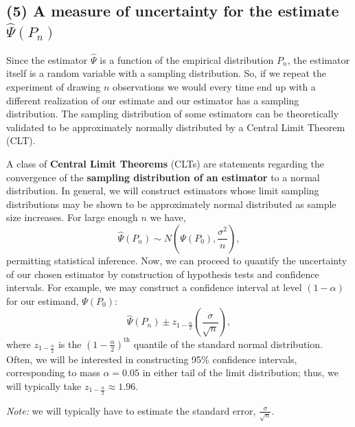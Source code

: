\documentclass[12pt, krantz2,]{book}
\theoremstyle{definition}
\theoremstyle{definition}
\theoremstyle{definition}
\newcommand{\1}{\mathbbm{1}}
\begin{document}
\hypertarget{a-measure-of-uncertainty-for-the-estimate-hatpsip_n}{%
\subsection*{\texorpdfstring{(5) A measure of uncertainty for the estimate \(\hat{\Psi}(P_n)\)}{(5) A measure of uncertainty for the estimate \textbackslash{}hat\{\textbackslash{}Psi\}(P\_n)}}\label{a-measure-of-uncertainty-for-the-estimate-hatpsip_n}}


Since the estimator \(\hat{\Psi}\) is a function of the empirical
distribution \(P_n\), the estimator itself is a random variable with a sampling
distribution. So, if we repeat the experiment of drawing \(n\) observations we
would every time end up with a different realization of our estimate and our
estimator has a sampling distribution. The sampling distribution of some estimators
can be theoretically validated to be approximately normally distributed by a
Central Limit Theorem (CLT).

A class of \textbf{Central Limit Theorems} (CLTs) are statements regarding the
convergence of the \textbf{sampling distribution of an estimator} to a normal
distribution. In general, we will construct estimators whose limit sampling
distributions may be shown to be approximately normal distributed as sample size
increases. For large enough \(n\) we have,
\begin{equation*}
  \hat{\Psi}(P_n) \sim N \left(\Psi(P_0), \frac{\sigma^2}{n}\right),
\end{equation*}
permitting statistical inference. Now, we can proceed to quantify the
uncertainty of our chosen estimator by construction of hypothesis tests and
confidence intervals. For example, we may construct a confidence interval at
level \((1 - \alpha)\) for our estimand, \(\Psi(P_0)\):
\begin{equation*}
  \hat{\Psi}(P_n) \pm z_{1 - \frac{\alpha}{2}}
    \left(\frac{\sigma}{\sqrt{n}}\right),
\end{equation*}
where \(z_{1 - \frac{\alpha}{2}}\) is the \((1 - \frac{\alpha}{2})^\text{th}\)
quantile of the standard normal distribution. Often, we will be interested in
constructing 95\% confidence intervals, corresponding to mass \(\alpha = 0.05\) in
either tail of the limit distribution; thus, we will typically take
\(z_{1 - \frac{\alpha}{2}} \approx 1.96\).

\emph{Note:} we will typically have to estimate the standard error,
\(\frac{\sigma}{\sqrt{n}}\).
\end{document}
